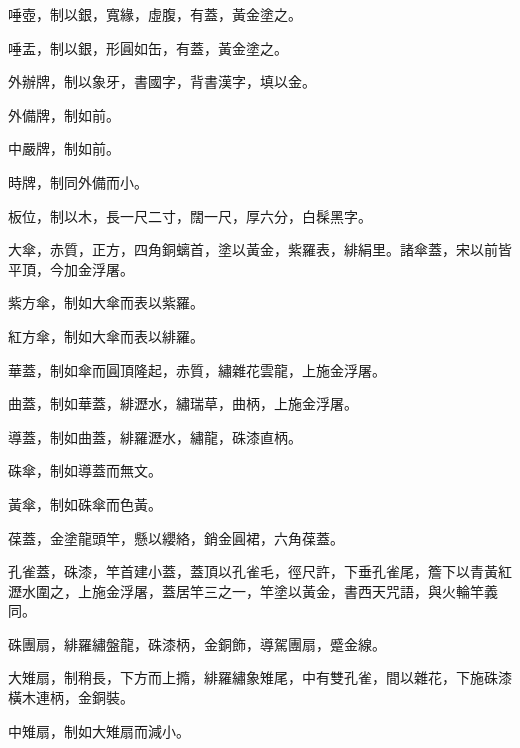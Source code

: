 \begin{pinyinscope}
 唾壺，制以銀，寬緣，虛腹，有蓋，黃金塗之。



 唾盂，制以銀，形圓如缶，有蓋，黃金塗之。



 外辦牌，制以象牙，書國字，背書漢字，填以金。



 外備牌，制如前。



 中嚴牌，制如前。



 時牌，制同外備而小。



 板位，制以木，長一尺二寸，闊一尺，厚六分，白髹黑字。



 大傘，赤質，正方，四角銅螭首，塗以黃金，紫羅表，緋絹里。諸傘蓋，宋以前皆平頂，今加金浮屠。



 紫方傘，制如大傘而表以紫羅。



 紅方傘，制如大傘而表以緋羅。



 華蓋，制如傘而圓頂隆起，赤質，繡雜花雲龍，上施金浮屠。



 曲蓋，制如華蓋，緋瀝水，繡瑞草，曲柄，上施金浮屠。



 導蓋，制如曲蓋，緋羅瀝水，繡龍，硃漆直柄。



 硃傘，制如導蓋而無文。



 黃傘，制如硃傘而色黃。



 葆蓋，金塗龍頭竿，懸以纓絡，銷金圓裙，六角葆蓋。



 孔雀蓋，硃漆，竿首建小蓋，蓋頂以孔雀毛，徑尺許，下垂孔雀尾，簷下以青黃紅瀝水圍之，上施金浮屠，蓋居竿三之一，竿塗以黃金，書西天咒語，與火輪竿義同。



 硃團扇，緋羅繡盤龍，硃漆柄，金銅飾，導駕團扇，蹙金線。



 大雉扇，制稍長，下方而上撱，緋羅繡象雉尾，中有雙孔雀，間以雜花，下施硃漆橫木連柄，金銅裝。



 中雉扇，制如大雉扇而減小。




\end{pinyinscope}
